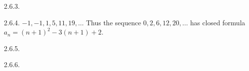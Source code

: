 \begin {itemize}
\begin{ans}{2.6.3.}
\end{ans}
\begin{ans}{2.6.4.}
		$-1, -1, 1, 5, 11, 19,\ldots$  Thus the sequence $0, 2, 6, 12, 20,\ldots$ has closed formula $a_n = (n+1)^2 - 3(n+1) + 2$.
	
\end{ans}
\begin{ans}{2.6.5.}
	
\end{ans}
\begin{ans}{2.6.6.}
	

\end{ans}
\end{itemize}
